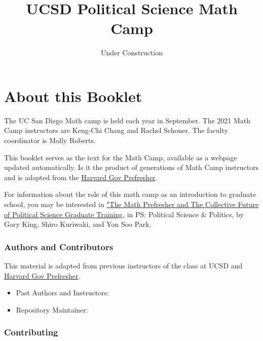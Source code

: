 \documentclass[
]{book}
\title{UCSD Political Science Math Camp}
\author{}
\date{\vspace{-2.5em}Under Construction}
\providecommand{\tightlist}{%
  \setlength{\itemsep}{0pt}\setlength{\parskip}{0pt}}
\theoremstyle{definition}
\theoremstyle{definition}
\theoremstyle{definition}
\theoremstyle{definition}
\theoremstyle{remark}
\begin{document}
\maketitle

{
\setcounter{tocdepth}{1}
\tableofcontents
}
\hypertarget{about-this-booklet}{%
\chapter*{About this Booklet}\label{about-this-booklet}}

The UC San Diego Math camp is held each year in September. The 2021 Math Camp instructors are Keng-Chi Chang and Rachel Schoner. The faculty coordinator is Molly Roberts.

This booklet serves as the text for the Math Camp, available as a webpage updated automatically. Is it the product of generations of Math Camp instructors and is adapted from the \href{https://github.com/IQSS/prefresher}{Harvard Gov Prefresher}.

For information about the role of this math camp as an introduction to graduate school, you may be interested in \href{https://gking.harvard.edu/prefresher}{"The Math Prefresher and The Collective Future of Political Science Graduate Training}, in PS: Political Science \& Politics, by Gary King, Shiro Kuriwaki, and Yon Soo Park.

\hypertarget{authors-and-contributors}{%
\subsection*{Authors and Contributors}\label{authors-and-contributors}}

This material is adapted from previous instructors of the class at UCSD and \href{https://github.com/IQSS/prefresher}{Harvard Gov Prefresher}.

\begin{itemize}
\tightlist
\item
  Past Authors and Instructors:\\
\item
  Repository Maintainer:
\end{itemize}

\hypertarget{contributing}{%
\subsection*{Contributing}\label{contributing}}
\end{document}
